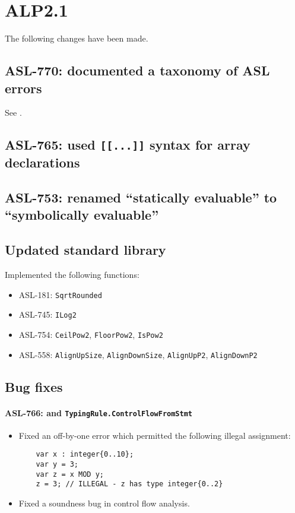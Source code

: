 \section{ALP2.1}

The following changes have been made.

\subsection{ASL-770: documented a taxonomy of ASL errors}
See .

\subsection{ASL-765:	used \texttt{[[...]]} syntax for array declarations}

\subsection{ASL-753: renamed ``statically evaluable'' to ``symbolically evaluable''}

\subsection{Updated standard library}
Implemented the following functions:
\begin{itemize}
  \item ASL-181: \texttt{SqrtRounded}
  \item ASL-745: \texttt{ILog2}
  \item ASL-754: \texttt{CeilPow2}, \texttt{FloorPow2}, \texttt{IsPow2}
  \item ASL-558: \texttt{AlignUpSize}, \texttt{AlignDownSize}, \texttt{AlignUpP2}, \texttt{AlignDownP2}
\end{itemize}

\subsection{Bug fixes}

\paragraph{ASL-766:  and \texttt{TypingRule.ControlFlowFromStmt}}
\begin{itemize}
  \item Fixed an off-by-one error which permitted the following illegal assignment:
    \begin{verbatim}
    var x : integer{0..10};
    var y = 3;
    var z = x MOD y;
    z = 3; // ILLEGAL - z has type integer{0..2}
    \end{verbatim}
  \item Fixed a soundness bug in control flow analysis.
\end{itemize}

